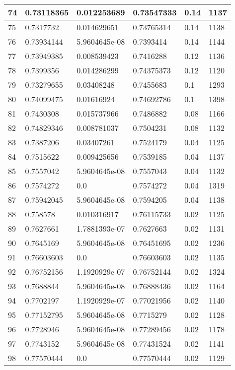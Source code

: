 \begin{longtable}{|l|l|l|l|l|l|}
74 & 0.73118365 & 0.012253689 & 0.73547333 & 0.14 & 1137 \\ \hline 
75 & 0.7317732 & 0.014629651 & 0.73765314 & 0.14 & 1138 \\ \hline 
76 & 0.73934144 & 5.9604645e-08 & 0.7393414 & 0.14 & 1144 \\ \hline 
77 & 0.73949385 & 0.008539423 & 0.7416288 & 0.12 & 1136 \\ \hline 
78 & 0.7399356 & 0.014286299 & 0.74375373 & 0.12 & 1120 \\ \hline 
79 & 0.73279655 & 0.03408248 & 0.7455683 & 0.1 & 1293 \\ \hline 
80 & 0.74099475 & 0.01616924 & 0.74692786 & 0.1 & 1398 \\ \hline 
81 & 0.7430308 & 0.015737966 & 0.7486882 & 0.08 & 1166 \\ \hline 
82 & 0.74829346 & 0.008781037 & 0.7504231 & 0.08 & 1132 \\ \hline 
83 & 0.7387206 & 0.03407261 & 0.7524179 & 0.04 & 1125 \\ \hline 
84 & 0.7515622 & 0.009425656 & 0.7539185 & 0.04 & 1137 \\ \hline 
85 & 0.7557042 & 5.9604645e-08 & 0.7557043 & 0.04 & 1132 \\ \hline 
86 & 0.7574272 & 0.0 & 0.7574272 & 0.04 & 1319 \\ \hline 
87 & 0.75942045 & 5.9604645e-08 & 0.7594205 & 0.04 & 1138 \\ \hline 
88 & 0.758578 & 0.010316917 & 0.76115733 & 0.02 & 1125 \\ \hline 
89 & 0.7627661 & 1.7881393e-07 & 0.7627663 & 0.02 & 1131 \\ \hline 
90 & 0.7645169 & 5.9604645e-08 & 0.76451695 & 0.02 & 1236 \\ \hline 
91 & 0.76603603 & 0.0 & 0.76603603 & 0.02 & 1135 \\ \hline 
92 & 0.76752156 & 1.1920929e-07 & 0.76752144 & 0.02 & 1324 \\ \hline 
93 & 0.7688844 & 5.9604645e-08 & 0.76888436 & 0.02 & 1164 \\ \hline 
94 & 0.7702197 & 1.1920929e-07 & 0.77021956 & 0.02 & 1140 \\ \hline 
95 & 0.77152795 & 5.9604645e-08 & 0.7715279 & 0.02 & 1128 \\ \hline 
96 & 0.7728946 & 5.9604645e-08 & 0.77289456 & 0.02 & 1178 \\ \hline 
97 & 0.7743152 & 5.9604645e-08 & 0.77431524 & 0.02 & 1141 \\ \hline 
98 & 0.77570444 & 0.0 & 0.77570444 & 0.02 & 1129 \\ \hline 

\end{longtable}
